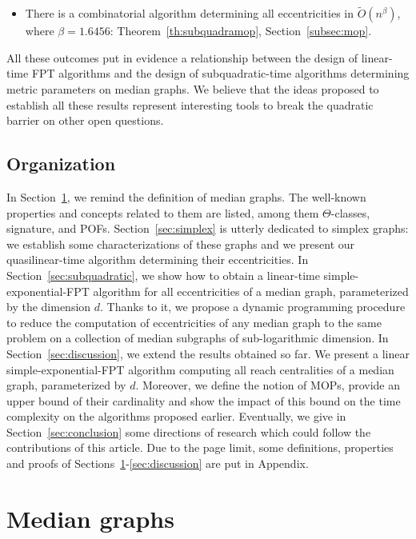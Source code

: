 \documentclass[a4paper,UKenglish,numberwithinsect,cleveref, autoref,anonymous]{lipics-v2021}
\begin{document}
\begin{itemize}
    \item There is a combinatorial algorithm determining all eccentricities in $\tilde{O}(n^{\beta})$, where $\beta = 1.6456$: Theorem~\ref{th:subquadramop}, Section~\ref{subsec:mop}.
\end{itemize}

All these outcomes put in evidence a relationship between the design of linear-time FPT algorithms and the design of subquadratic-time algorithms determining metric parameters on median graphs. We believe that the ideas proposed to establish all these results represent interesting tools to break the quadratic barrier on other open questions.

\subsection{Organization}

In Section~\ref{sec:median}, we remind the definition of median graphs. The well-known properties and concepts related to them are listed, among them $\Theta$-classes, signature, and POFs. Section~\ref{sec:simplex} is utterly dedicated to simplex graphs: we establish some characterizations of these graphs and we present our quasilinear-time algorithm determining their eccentricities. In Section~\ref{sec:subquadratic}, we show how to obtain a linear-time simple-exponential-FPT algorithm for all eccentricities of a median graph, parameterized by the dimension $d$. Thanks to it, we propose a dynamic programming procedure to reduce the computation of eccentricities of any median graph to the same problem on a collection of median subgraphs of sub-logarithmic dimension. In Section~\ref{sec:discussion}, we extend the results obtained so far. We present a linear simple-exponential-FPT algorithm computing all reach centralities of a median graph, parameterized by $d$. Moreover, we define the notion of MOPs, provide an upper bound of their cardinality and show the impact of this bound on the time complexity on the algorithms proposed earlier. Eventually, we give in Section~\ref{sec:conclusion} some directions of research which could follow the contributions of this article. Due to the page limit, some definitions, properties and proofs of Sections~\ref{sec:median}-\ref{sec:discussion} are put in Appendix.

\section{Median graphs} \label{sec:median}
\end{document}
